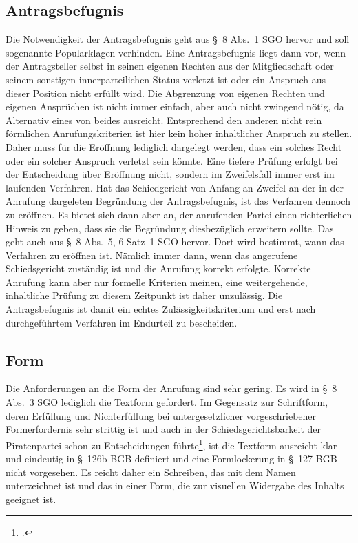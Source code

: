 \subsection{Antragsbefugnis}
\label{Standardworkflow:Antragsbefugnis}
Die Notwendigkeit der Antragsbefugnis geht aus \S~8 Abs.~1 SGO hervor und soll sogenannte Popularklagen verhinden.
Eine Antragsbefugnis liegt dann vor, wenn der Antragsteller selbst in seinen eigenen Rechten aus der Mitgliedschaft oder seinem sonstigen innerparteilichen Status verletzt ist oder ein Anspruch aus dieser Position nicht erfüllt wird.
Die Abgrenzung von eigenen Rechten und eigenen Ansprüchen ist nicht immer einfach, aber auch nicht zwingend nötig, da Alternativ eines von beides ausreicht.
Entsprechend den anderen nicht rein förmlichen Anrufungskriterien ist hier kein hoher inhaltlicher Anspruch zu stellen.
Daher muss für die Eröffnung lediglich dargelegt werden, dass ein solches Recht oder ein solcher Anspruch verletzt sein könnte.
Eine tiefere Prüfung erfolgt bei der Entscheidung über Eröffnung nicht, sondern im Zweifelsfall immer erst im laufenden Verfahren.
Hat das Schiedgericht von Anfang an Zweifel an der in der Anrufung dargeleten Begründung der Antragsbefugnis, ist das Verfahren dennoch zu eröffnen. Es bietet sich dann aber an, der anrufenden Partei einen richterlichen Hinweis zu geben, dass sie die Begründung diesbezüglich erweitern sollte.
Das geht auch aus \S~8 Abs.~5, 6 Satz~1 SGO hervor. Dort wird bestimmt, wann das Verfahren zu eröffnen ist. Nämlich immer dann, wenn das angerufene Schiedsgericht zuständig ist und die Anrufung korrekt erfolgte.
Korrekte Anrufung kann aber nur formelle Kriterien meinen, eine weitergehende, inhaltliche Prüfung zu diesem Zeitpunkt ist daher unzulässig.
Die Antragsbefugnis ist damit ein echtes Zulässigkeitskriterium und erst nach durchgeführtem Verfahren im Endurteil zu bescheiden.

\subsection{Form}
\label{Standardworkflow:Form}
Die Anforderungen an die Form der Anrufung sind sehr gering.
Es wird in \S~8 Abs.~3 SGO lediglich die Textform gefordert.
Im Gegensatz zur Schriftform, deren Erfüllung und Nichterfüllung bei untergesetzlicher vorgeschriebener Formerfordernis sehr strittig ist und auch in der Schiedsgerichtsbarkeit der Piratenpartei schon zu Entscheidungen führte\footcite{LSGBB146}, ist die Textform ausreicht klar und eindeutig in \S~126b BGB definiert und eine Formlockerung in \S~127 BGB nicht vorgesehen.
Es reicht daher ein Schreiben, das mit dem Namen unterzeichnet ist und das in einer Form, die zur visuellen Widergabe des Inhalts geeignet ist.


